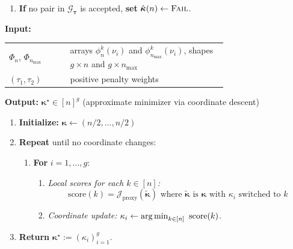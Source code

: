 \documentclass{article} %
\newcommand{\hp}{\nu}                             %
\newcommand{\hptrunc}{\kappa}
\newcommand{\bhptrunc}{\bm{\kappa}}
\newcommand{\gridsize}{g}
\newcommand{\decompobj}{\mathcal{J}}
\newcommand{\btau}{\boldsymbol{\tau}}
\begin{document}
\begin{algorithm}[htbp]
\begin{enumerate}
\begin{enumerate}
\begin{enumerate}
            $\Delta:=\max\{|a_n-a_n^{\mathrm{tot}}|,\ |a_{\infty}-a_{\infty}^{\mathrm{tot}}|\}$ 
      \item \textbf{If} $E_{\mathrm{cvx}}\le \varepsilon_{\mathrm{cvx}}$ \textbf{and} $\Delta\le \varepsilon_{\mathrm{amin}}$,
            \textbf{set} $\hat{\bhptrunc}(n)\gets \bhptrunc$ and \textbf{break} to the next $n$.
    \end{enumerate}
    \item \textbf{If} no pair in $\mathcal{G}_{\btau}$ is accepted, \textbf{set} $\hat{\bhptrunc}(n)\gets \textsc{Fail}$.
  \end{enumerate}
\end{enumerate}
\end{algorithm}

\begin{algorithm}[htbp]
\caption{Minimize Proxy Objective Eq.\ (\ref{eq:decomp_objective_proxy})}
\label{alg:minimize-proxy}
\DontPrintSemicolon
\textbf{Input:}

\begin{tabular}{@{}l p{0.72\linewidth}}
\quad$\Phi_n$, $\Phi_{n_{\max}}$& arrays $\phi_n^{k}(\hp_i)$ and $\phi_{n_{\max}}^{k}(\hp_i)$, shapes $\gridsize \times n$ and $\gridsize \times n_{\max}$\\
\quad$(\tau_1,\tau_2)$ & positive penalty weights
\end{tabular}

\medskip
\textbf{Output:} $\bhptrunc^\star \in [n]^{\gridsize}$ (approximate minimizer via coordinate descent)

\medskip

\begin{enumerate}
  \item \textbf{Initialize:} $\bhptrunc \leftarrow (n/2, \ldots, n/2)$
  \item \textbf{Repeat} until no coordinate changes:
    \begin{enumerate}    
    \item[] \textbf{For} $i=1,\ldots,\gridsize$:
    \begin{enumerate}
      \item \emph{Local scores for each $k\in[n]$:}
            \[
                \mathrm{score}(k) = \decompobj_{\mathrm{proxy}}(\tilde{\bhptrunc}) \text{ where } \tilde{\bhptrunc} \text{ is } \bhptrunc\text{ with } \hptrunc_i \text{ switched to } k
            \] 
      \item \emph{Coordinate update:} $\hptrunc_i \leftarrow \argmin_{k \in [n]}~\mathrm{score}(k)$.
    \end{enumerate}
    \end{enumerate}
  \item \textbf{Return} $\bhptrunc^\star :=(\hptrunc_i)_{i=1}^{\gridsize}$.
\end{enumerate}
\end{algorithm}
\end{document}

